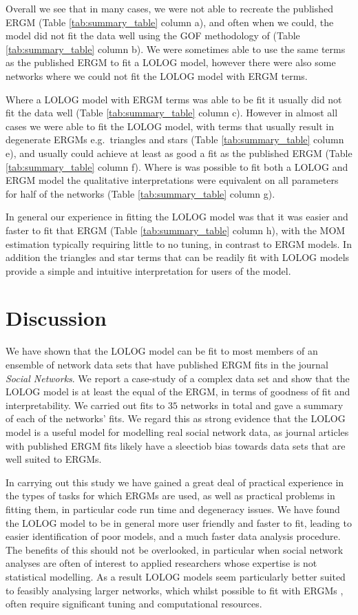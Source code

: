 \documentclass[
]{statsoc}
\begin{document}
Overall we see that in many cases, we were not able to recreate the
published ERGM (Table \ref{tab:summary_table} column a), and often when
we could, the model did not fit the data well using the GOF methodology
of \cite{Hunter_Goodreau_2008} (Table \ref{tab:summary_table} column b).
We were sometimes able to use the same terms as the published ERGM to
fit a LOLOG model, however there were also some networks where we could
not fit the LOLOG model with ERGM terms.

Where a LOLOG model with ERGM terms was able to be fit it usually did
not fit the data well (Table \ref{tab:summary_table} column c). However
in almost all cases we were able to fit the LOLOG model, with terms that
usually result in degenerate ERGMs e.g.~triangles and stars (Table
\ref{tab:summary_table} column e), and usually could achieve at least as
good a fit as the published ERGM (Table \ref{tab:summary_table} column
f). Where is was possible to fit both a LOLOG and ERGM model the
qualitative interpretations were equivalent on all parameters for half
of the networks (Table \ref{tab:summary_table} column g).

In general our experience in fitting the LOLOG model was that it was
easier and faster to fit that ERGM (Table \ref{tab:summary_table} column
h), with the MOM estimation typically requiring little to no tuning, in
contrast to ERGM models. In addition the triangles and star terms that
can be readily fit with LOLOG models provide a simple and intuitive
interpretation for users of the model.

\section{Discussion}\label{sec:discussion}

We have shown that the LOLOG model can be fit to most members of an
ensemble of network data sets that have published ERGM fits in the
journal \textit{Social Networks}. We report a case-study of a complex
data set and show that the LOLOG model is at least the equal of the
ERGM, in terms of goodness of fit and interpretability. We carried out
fits to \(35\) networks in total and gave a summary of each of the
networks' fits. We regard this as strong evidence that the LOLOG model
is a useful model for modelling real social network data, as journal
articles with published ERGM fits likely have a sleectiob bias towards
data sets that are well suited to ERGMs.

In carrying out this study we have gained a great deal of practical
experience in the types of tasks for which ERGMs are used, as well as
practical problems in fitting them, in particular code run time and
degeneracy issues. We have found the LOLOG model to be in general more
user friendly and faster to fit, leading to easier identification of
poor models, and a much faster data analysis procedure. The benefits of
this should not be overlooked, in particular when social network
analyses are often of interest to applied researchers whose expertise is
not statistical modelling. As a result LOLOG models seem particularly
better suited to feasibly analysing larger networks, which whilst
possible to fit with ERGMs \citep{stivala2020}, often require
significant tuning and computational resources.
\end{document}
